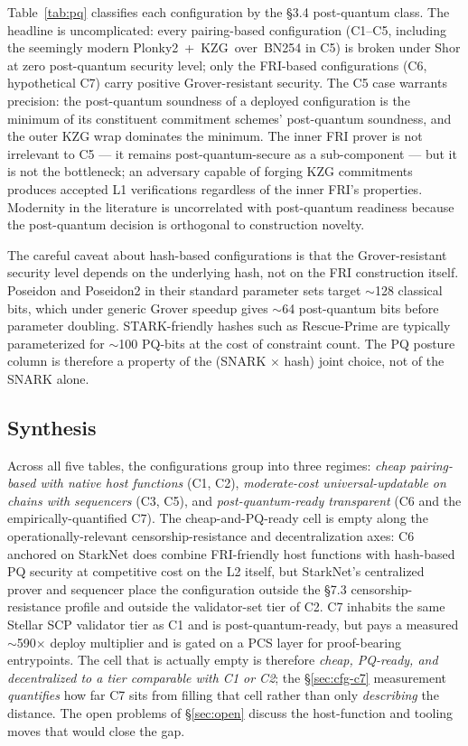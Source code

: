 Table~\ref{tab:pq} classifies each configuration by the §3.4
post-quantum class. The headline is uncomplicated: every
pairing-based configuration (C1--C5, including the seemingly modern
Plonky2~+~KZG~over~BN254 in C5) is broken under Shor at zero
post-quantum security level; only the FRI-based configurations
(C6, hypothetical C7) carry positive Grover-resistant security. The
C5 case warrants precision: the post-quantum soundness of a deployed
configuration is the minimum of its constituent commitment schemes'
post-quantum soundness, and the outer KZG wrap dominates the
minimum. The inner FRI prover is not irrelevant to C5 --- it remains
post-quantum-secure as a sub-component --- but it is not the
bottleneck; an adversary capable of forging KZG commitments produces
accepted L1 verifications regardless of the inner FRI's properties.
Modernity in the literature is uncorrelated with post-quantum
readiness because the post-quantum decision is orthogonal to
construction novelty.



The careful caveat about hash-based configurations is that the
Grover-resistant security level depends on the underlying hash, not
on the FRI construction itself. Poseidon and Poseidon2 in their
standard parameter sets target $\sim$128 classical bits, which under
generic Grover speedup gives $\sim$64 post-quantum bits before
parameter doubling. STARK-friendly hashes such as Rescue-Prime are
typically parameterized for $\sim$100 PQ-bits at the cost of
constraint count. The PQ posture column is therefore a property of
the (SNARK $\times$ hash) joint choice, not of the SNARK alone.

\subsection{Synthesis}
\label{sec:analysis-synthesis}

Across all five tables, the configurations group into three regimes:
\emph{cheap pairing-based with native host functions} (C1, C2),
\emph{moderate-cost universal-updatable on chains with sequencers}
(C3, C5), and \emph{post-quantum-ready transparent} (C6 and the
empirically-quantified C7). The cheap-and-PQ-ready cell is empty
along the operationally-relevant censorship-resistance and
decentralization axes: C6 anchored on StarkNet does combine
FRI-friendly host functions with hash-based PQ security at
competitive cost on the L2 itself, but StarkNet's centralized prover
and sequencer place the configuration outside the §7.3
censorship-resistance profile and outside the validator-set tier of
C2. C7 inhabits the same Stellar SCP validator tier as C1 and is
post-quantum-ready, but pays a measured $\sim$590$\times$ deploy
multiplier and is gated on a PCS layer for proof-bearing entrypoints.
The cell that is actually empty is therefore \emph{cheap, PQ-ready,
and decentralized to a tier comparable with C1 or C2}; the
\S\ref{sec:cfg-c7} measurement \emph{quantifies} how far C7 sits
from filling that cell rather than only \emph{describing} the
distance. The open problems of \S\ref{sec:open} discuss the
host-function and tooling moves that would close the gap.
